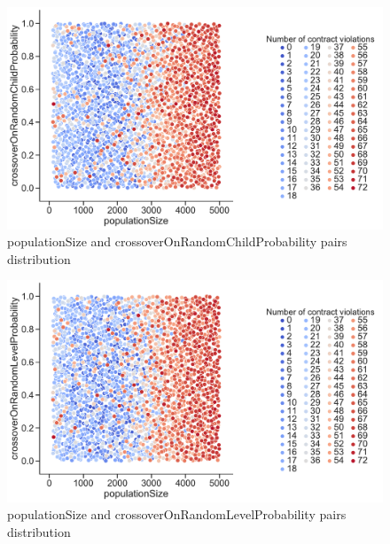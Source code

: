 \begin{figure}
	\centering
	\includegraphics[width=\textwidth]{images/PairsDistr/populationSize_crossoverOnRandomChildProbability.pdf}
	\caption[populationSize and crossoverOnRandomChildProbability pairs distribution]{populationSize and crossoverOnRandomChildProbability pairs distribution}
	\label{fig:populationSize_crossoverOnRandomChildProbability_pair}
\end{figure}
\clearpage
\begin{figure}
	\centering
	\includegraphics[width=\textwidth]{images/PairsDistr/populationSize_crossoverOnRandomLevelProbability.pdf}
	\caption[populationSize and crossoverOnRandomLevelProbability pairs distribution]{populationSize and crossoverOnRandomLevelProbability pairs distribution}
	\label{fig:populationSize_crossoverOnRandomLevelProbability_pair}
\end{figure}
\clearpage

